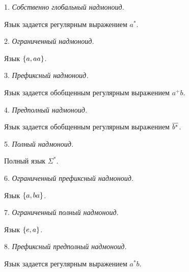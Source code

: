 

\smallskip





1. {\it Собственно глобальный надмоноид.\/}


 Язык задается регулярным выражением $a^*$.


\medskip







\smallskip





2. {\it Ограниченный надмоноид.\/}


 Язык $\{ a,aa \}$.





3. {\it Префиксный надмоноид.\/}


 Язык задается обобщенным регулярным выражением $a^+b$.





4. {\it Предполный надмоноид.\/}


 Язык задается обобщенным регулярным выражением $\overline{b^*}$.





5. {\it Полный надмоноид.\/}


 Полный язык $\Sigma^*$.


\medskip







\smallskip





6. {\it Ограниченный префиксный надмоноид.\/}


 Язык $\{ a,ba \}$.





7. {\it Ограниченный полный надмоноид.\/}


 Язык $\{ e,a \}$.





8. {\it Префиксный предполный надмоноид.\/}


 Язык задается регулярным выражением $a^*b$.





